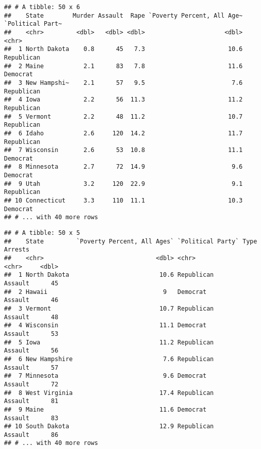 \documentclass[]{article}
\newenvironment{Shaded}{\begin{snugshade}}{\end{snugshade}}
\newcommand{\KeywordTok}[1]{\textcolor[rgb]{0.13,0.29,0.53}{\textbf{#1}}}
\newcommand{\NormalTok}[1]{#1}
\newcommand{\OperatorTok}[1]{\textcolor[rgb]{0.81,0.36,0.00}{\textbf{#1}}}
\newcommand{\StringTok}[1]{\textcolor[rgb]{0.31,0.60,0.02}{#1}}
\begin{document}
\begin{Shaded}
\end{Shaded}

\begin{verbatim}
## # A tibble: 50 x 6
##    State        Murder Assault  Rape `Poverty Percent, All Age~ `Political Part~
##    <chr>         <dbl>   <dbl> <dbl>                      <dbl> <chr>           
##  1 North Dakota    0.8      45   7.3                       10.6 Republican      
##  2 Maine           2.1      83   7.8                       11.6 Democrat        
##  3 New Hampshi~    2.1      57   9.5                        7.6 Republican      
##  4 Iowa            2.2      56  11.3                       11.2 Republican      
##  5 Vermont         2.2      48  11.2                       10.7 Republican      
##  6 Idaho           2.6     120  14.2                       11.7 Republican      
##  7 Wisconsin       2.6      53  10.8                       11.1 Democrat        
##  8 Minnesota       2.7      72  14.9                        9.6 Democrat        
##  9 Utah            3.2     120  22.9                        9.1 Republican      
## 10 Connecticut     3.3     110  11.1                       10.3 Democrat        
## # ... with 40 more rows
\end{verbatim}

\begin{Shaded}
\end{Shaded}

\begin{verbatim}
## # A tibble: 50 x 5
##    State         `Poverty Percent, All Ages` `Political Party` Type    Arrests
##    <chr>                               <dbl> <chr>             <chr>     <dbl>
##  1 North Dakota                         10.6 Republican        Assault      45
##  2 Hawaii                                9   Democrat          Assault      46
##  3 Vermont                              10.7 Republican        Assault      48
##  4 Wisconsin                            11.1 Democrat          Assault      53
##  5 Iowa                                 11.2 Republican        Assault      56
##  6 New Hampshire                         7.6 Republican        Assault      57
##  7 Minnesota                             9.6 Democrat          Assault      72
##  8 West Virginia                        17.4 Republican        Assault      81
##  9 Maine                                11.6 Democrat          Assault      83
## 10 South Dakota                         12.9 Republican        Assault      86
## # ... with 40 more rows
\end{verbatim}
\end{document}
